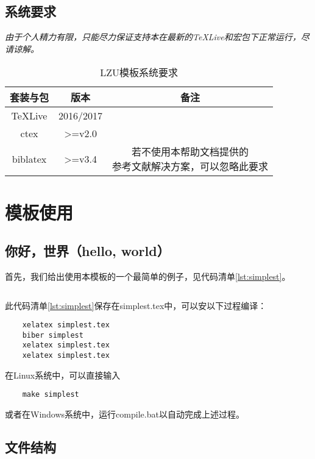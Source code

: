 \documentclass[oneside]{LZU}
\newenvironment{note}{\par\itshape\noindent{\makebox[-5pt][r]{\scriptsize\color{red!90}\textdbend\quad}}}{\par}
\newcommand{\filename}[1]{{\ttfamily #1}}
\newcommand{\package}[1]{{\sffamily #1}}
\begin{document}
\section{系统要求}
\begin{note}
    由于个人精力有限，只能尽力保证支持本在最新的TeXLive和宏包下正常运行，尽请谅解。
\end{note}
\begin{table}[htb]
    \centering
    \caption{\package{LZU}模板系统要求}
    \begin{tabular}{c|c|c}
        \Xhline{1.2pt}
        套装与包 & 版本 & 备注 \\
        \hline
        TeXLive & 2016/2017 & \\
        \hline
        \package{ctex} & >=v2.0 & \\
        \hline
        \package{biblatex} & >=v3.4 & \makecell[l]{若不使用本帮助文档提供的\\参考文献解决方案，可以忽略此要求}\\
        \hline
    \end{tabular}
\end{table}

\chapter{模板使用}
\section{你好，世界（hello, world）}
首先，我们给出使用本模板的一个最简单的例子，见代码清单\ref{lst:simplest}。

\begingroup
    \label{lst:simplest}
    \inputminted[breaklines,frame=single,linenos]{latex}{simplest.tex}
\endgroup
此代码清单\ref{lst:simplest}保存在\filename{simplest.tex}中，可以安以下过程编译：
\begin{verbatim}
    xelatex simplest.tex
    biber simplest
    xelatex simplest.tex
    xelatex simplest.tex
\end{verbatim}
在Linux系统中，可以直接输入
\begin{verbatim}
    make simplest
\end{verbatim}
或者在Windows系统中，运行\filename{compile.bat}以自动完成上述过程。

\section{文件结构}
\end{document}
